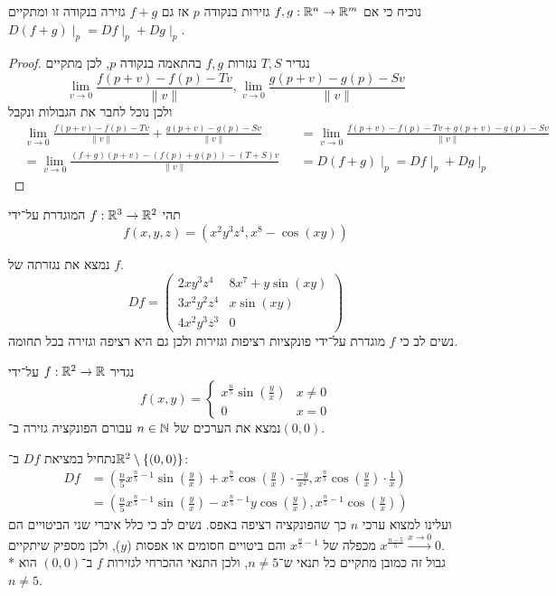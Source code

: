 \Subquestion{}
נוכיח כי אם $f, g : \mathbb{R}^n \to \mathbb{R}^m$ גזירות בנקודה $p$ אז גם $f + g$ גזירה בנקודה זו ומתקיים $D(f + g)\mid_p = Df\mid_p + Dg\mid_p$.
\begin{proof}
	נגדיר $T, S$ נגזרות $f, g$ בהתאמה בנקודה $p$, לכן מתקיים
	\[
		\lim_{v \to 0} \frac{f(p + v) - f(p) - Tv}{\lVert v \rVert},
		\lim_{v \to 0} \frac{g(p + v) - g(p) - Sv}{\lVert v \rVert}
	\]
	ולכן נוכל לחבר את הגבולות ונקבל
	\begin{align*}
		& \lim_{v \to 0} \frac{f(p + v) - f(p) - Tv}{\lVert v \rVert} + \frac{g(p + v) - g(p) - Sv}{\lVert v \rVert}
		& & = \lim_{v \to 0} \frac{f(p + v) - f(p) - Tv + g(p + v) - g(p) - Sv}{\lVert v \rVert} \\
		& = \lim_{v \to 0} \frac{(f + g)(p + v) - (f(p) + g(p)) - (T + S)v}{\lVert v \rVert}
		& & = D(f + g)\mid_p = Df\mid_p + Dg\mid_p
	\end{align*}
\end{proof}

\Question{}
\Subquestion{}
תהי $f : \mathbb{R}^3 \to \mathbb{R}^2$ המוגדרת על־ידי
\[
	f(x, y, z) = (x^2 y^3 z^4, x^8 - \cos(xy))
\]

נמצא את נגזרתה של $f$.
\[
	Df = \begin{pmatrix}
		2 x y^3 z^4 & 8x^7 + y \sin(xy) \\
		3 x^2 y^2 z^4 & x \sin(xy) \\
		4 x^2 y^3 z^3 & 0
	\end{pmatrix}
\]
נשים לב כי $f$ מוגדרת על־ידי פונקציות רציפות וגזירות ולכן גם היא רציפה וגזירה בכל תחומה.

\Subquestion{}
נגדיר $f : \mathbb{R}^2 \to \mathbb{R}$ על־ידי
\[
	f(x, y) = \begin{cases}
		x^\frac{n}{5} \sin(\frac{y}{x}) & x \ne 0 \\
		0 & x = 0
	\end{cases}
\]
נמצא את הערכים של $n \in \mathbb{N}$ עבורם הפונקציה גזירה ב־$(0, 0)$.

נתחיל במציאת $Df$ ב־$\mathbb{R}^2 \setminus\{(0, 0)\}$:
\begin{align*}
	Df & = \left( \frac{n}{5}x^{\frac{n}{5} - 1} \sin(\frac{y}{x}) + x^\frac{n}{5} \cos(\frac{y}{x}) \cdot \frac{-y}{x^2}, x^\frac{n}{5} \cos(\frac{y}{x}) \cdot \frac{1}{x} \right) \\
	   & = \left( \frac{n}{5}x^{\frac{n}{5} - 1} \sin(\frac{y}{x}) - x^{\frac{n}{5} - 1} y \cos(\frac{y}{x}), x^{\frac{n}{5} - 1} \cos(\frac{y}{x}) \right)
\end{align*}
ועלינו למצוא ערכי $n$ כך שהפונקציה רציפה באפס.
נשים לב כי כלל איברי שני הביטויים הם מכפלה של $x^{\frac{n}{5} - 1}$ והם ביטויים חסומים או אפסות ($y$), ולכן מספיק שיתקיים $x^{\frac{n - 5}{5}} \xrightarrow{x \to 0} 0$. \\*
גבול זה כמובן מתקיים כל תנאי ש־$n \ne 5$, ולכן התנאי ההכרחי לגזירות $f$ ב־$(0, 0)$ הוא $n \ne 5$.

